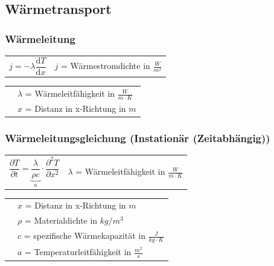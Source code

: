 	\newpage
	\subsection{Wärmetransport}
		\subsubsection{Wärmeleitung}
			\begin{minipage}[t]{16cm}
					\renewcommand{\arraystretch}{2.5}
					\begin{tabular}{ p{4cm} | p{7cm}}
						$j = -\lambda \dfrac{\mathrm{d}T}{\mathrm{d}x}$	&	$j$ = Wärmestromdichte in $\frac{W}{m^2}$\\
					\end{tabular}
					\renewcommand{\arraystretch}{1.5}
					\begin{tabular}{ p{4cm} | p{7cm} }
						& $\lambda$ = Wärmeleitfähigkeit in $\frac{W}{m \cdot K}$\\
						& $x$ = Distanz in x-Richtung in $m$\\
					\end{tabular} 
					\renewcommand{\arraystretch}{1}
			\end{minipage}
		\newline
		\newline
		\begin{minipage}[t]{13cm}
			\subsubsection{Wärmeleitungsgleichung (Instationär (Zeitabhängig))}
				\renewcommand{\arraystretch}{2.5}
				\begin{tabular}{ p{4cm} | p{7cm}}
					$\dfrac{\partial T}{\partial t} = \underbrace{\dfrac{\lambda}{\rho c}}_a \cdot \dfrac{\partial^2 T}{\partial x^2}$	& $\lambda$ = Wärmeleitfähigkeit in $\frac{W}{m \cdot K}$\\
				\end{tabular}
				\renewcommand{\arraystretch}{1.5}
				\begin{tabular}{ p{4cm} | p{7cm} }
					& $x$ = Distanz in x-Richtung in $m$\\
					& $\rho$ = Materialdichte in $kg/m^3$\\
					& $c$ = spezifische Wärmekapazität in $\frac{J}{kg \cdot K}$\\
					& $a$ = Temperaturleitfähigkeit in $\frac{m^2}{s}$
				\end{tabular} 
				\renewcommand{\arraystretch}{1}
		\end{minipage}
